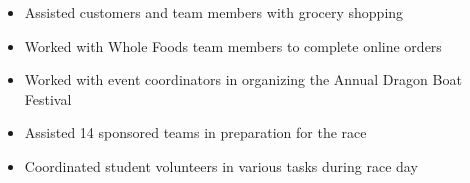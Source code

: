 \documentclass[10pt,letter]{altacv}
\begin{document}

\divider

\begin{itemize}
  \item Assisted customers and team members with grocery shopping 
  \item Worked with Whole Foods team members to complete online orders
\end{itemize}

\divider

\begin{itemize}
  \item Worked with event coordinators in organizing the Annual Dragon Boat Festival
  \item Assisted 14 sponsored teams in preparation for the race
  \item Coordinated student volunteers in various tasks during race day
\end{itemize}



\clearpage
\end{document}
